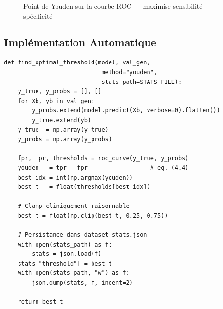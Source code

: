 \documentclass[12pt, a4paper]{report}
\begin{document}
\begin{figure}[h]
  \centering
  \caption{Point de Youden sur la courbe ROC — maximise sensibilité + spécificité}
  \label{fig:roc_youden}
\end{figure}

\subsection{Implémentation Automatique}

\begin{lstlisting}[caption={Calcul du seuil optimal (brats\_classifier.py)},
                   label={lst:youden}]
def find_optimal_threshold(model, val_gen,
                            method="youden",
                            stats_path=STATS_FILE):
    y_true, y_probs = [], []
    for Xb, yb in val_gen:
        y_probs.extend(model.predict(Xb, verbose=0).flatten())
        y_true.extend(yb)
    y_true  = np.array(y_true)
    y_probs = np.array(y_probs)

    fpr, tpr, thresholds = roc_curve(y_true, y_probs)
    youden   = tpr - fpr                  # eq. (4.4)
    best_idx = int(np.argmax(youden))
    best_t   = float(thresholds[best_idx])

    # Clamp cliniquement raisonnable
    best_t = float(np.clip(best_t, 0.25, 0.75))

    # Persistance dans dataset_stats.json
    with open(stats_path) as f:
        stats = json.load(f)
    stats["threshold"] = best_t
    with open(stats_path, "w") as f:
        json.dump(stats, f, indent=2)

    return best_t
\end{lstlisting}
\end{document}
